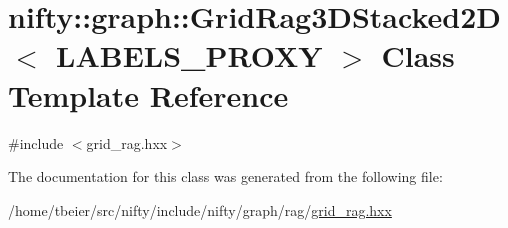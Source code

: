 \hypertarget{classnifty_1_1graph_1_1GridRag3DStacked2D}{}\section{nifty\+:\+:graph\+:\+:Grid\+Rag3\+D\+Stacked2\+D$<$ L\+A\+B\+E\+L\+S\+\_\+\+P\+R\+O\+X\+Y $>$ Class Template Reference}
\label{classnifty_1_1graph_1_1GridRag3DStacked2D}


{\ttfamily \#include $<$grid\+\_\+rag.\+hxx$>$}



The documentation for this class was generated from the following file\+:\begin{DoxyCompactItemize}
\item 
/home/tbeier/src/nifty/include/nifty/graph/rag/\hyperlink{grid__rag_8hxx}{grid\+\_\+rag.\+hxx}\end{DoxyCompactItemize}
